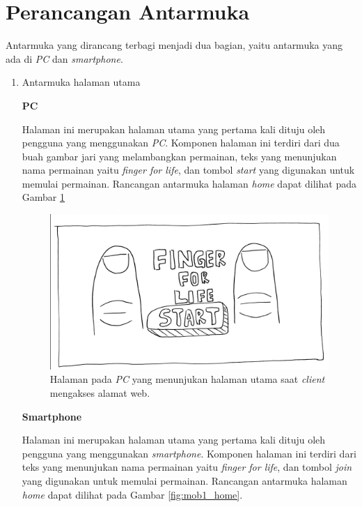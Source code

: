 \section{Perancangan Antarmuka}
\label{sec:antarmuka}

Antarmuka yang dirancang terbagi menjadi dua bagian, yaitu antarmuka yang ada di \textit{PC} dan \textit{smartphone}.

\begin{enumerate}
	\item Antarmuka halaman utama
	
	\textbf{PC}
	
	Halaman ini merupakan halaman utama yang pertama kali dituju oleh pengguna yang menggunakan \textit{PC}. Komponen halaman ini terdiri dari dua buah gambar jari yang melambangkan permainan, teks yang menunjukan nama permainan yaitu \textit{finger for life}, dan tombol \textit{start} yang digunakan untuk memulai permainan. Rancangan antarmuka halaman \textit{home} dapat dilihat pada Gambar \ref{fig:web1_home}

\begin{figure}[H]
	\centering
	\includegraphics[scale=0.1]{Gambar/web1_home}
	\caption{Halaman pada \textit{PC} yang menunjukan halaman utama saat \textit{client} mengakses alamat web.}
	\label{fig:web1_home}
\end{figure}

	\textbf{Smartphone}
	
	Halaman ini merupakan halaman utama yang pertama kali dituju oleh pengguna yang menggunakan \textit{smartphone}. Komponen halaman ini terdiri dari teks yang menunjukan nama permainan yaitu \textit{finger for life}, dan tombol \textit{join} yang digunakan untuk memulai permainan. Rancangan antarmuka halaman \textit{home} dapat dilihat pada Gambar \ref{fig:mob1_home}.
	

\end{enumerate}
